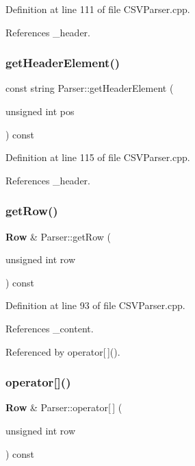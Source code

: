 Definition at line 111 of file C\+S\+V\+Parser.\+cpp.



References \+\_\+header.

\mbox{\label{class_parser_adff671135239b5031b8eb937eb9cd844}} 
\subsubsection{getHeaderElement()}
{\footnotesize\ttfamily const string Parser\+::get\+Header\+Element (\begin{DoxyParamCaption}\item[{unsigned int}]{pos }\end{DoxyParamCaption}) const}



Definition at line 115 of file C\+S\+V\+Parser.\+cpp.



References \+\_\+header.

\mbox{\label{class_parser_a4cbc7632e6bb4841275884cbc128e25a}} 
\subsubsection{getRow()}
{\footnotesize\ttfamily \textbf{ Row} \& Parser\+::get\+Row (\begin{DoxyParamCaption}\item[{unsigned int}]{row }\end{DoxyParamCaption}) const}



Definition at line 93 of file C\+S\+V\+Parser.\+cpp.



References \+\_\+content.



Referenced by operator[$\,$]().

\mbox{\label{class_parser_a9c29df2f64942cac1dcc1f5d63b4fb36}} 
\subsubsection{operator[]()}
{\footnotesize\ttfamily \textbf{ Row} \& Parser\+::operator[$\,$] (\begin{DoxyParamCaption}\item[{unsigned int}]{row }\end{DoxyParamCaption}) const}



